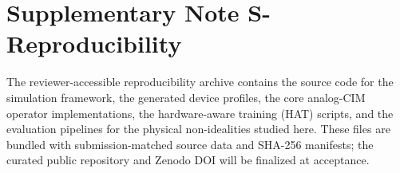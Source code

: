 
\section*{Supplementary Note S-Reproducibility}
\label{supp:reproducibility}

The reviewer-accessible reproducibility archive contains the source code for the simulation framework, the generated device profiles, the core analog-CIM operator implementations, the hardware-aware training (HAT) scripts, and the evaluation pipelines for the physical non-idealities studied here. These files are bundled with submission-matched source data and SHA-256 manifests; the curated public repository and Zenodo DOI will be finalized at acceptance.
